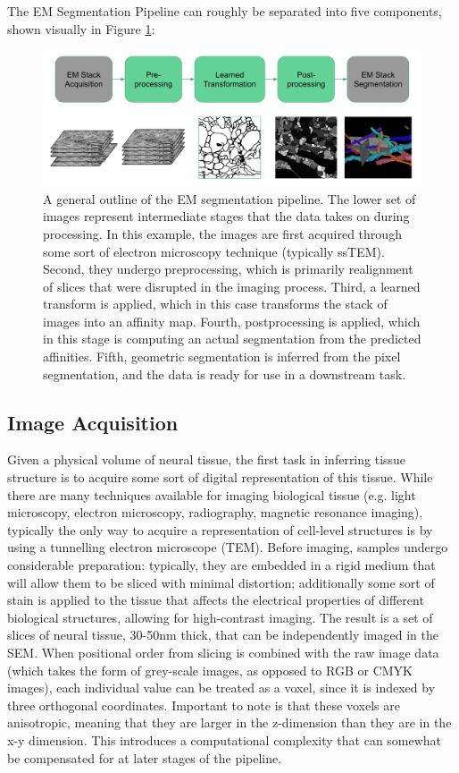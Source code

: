 The EM Segmentation Pipeline can roughly be separated into five components, shown visually in Figure \ref{fig:segmentation_pipeline}:

\begin{figure}
\centering
\includegraphics[width=\textwidth]{img/seg_pipeline.png}
\caption[A general outline of the EM segmentation pipeline]{A general outline of the EM segmentation pipeline. The lower set of images represent intermediate stages that the data takes on during processing. In this example, the images are first acquired through some sort of electron microscopy technique (typically ssTEM). Second, they undergo preprocessing, which is primarily realignment of slices that were disrupted in the imaging process. Third, a learned transform is applied, which in this case transforms the stack of images into an affinity map. Fourth, postprocessing is applied, which in this stage is computing an actual segmentation from the predicted affinities. Fifth, geometric segmentation is inferred from the pixel segmentation, and the data is ready for use in a downstream task. }
\label{fig:segmentation_pipeline}
\end{figure}

\subsection{Image Acquisition}
Given a physical volume of neural tissue, the first task in inferring tissue structure is to acquire some sort of digital representation of this tissue. While there are many techniques available for imaging biological tissue (e.g. light microscopy, electron microscopy, radiography, magnetic resonance imaging), typically the only way to acquire a representation of cell-level structures is by using a tunnelling electron microscope (TEM)\cite{Mielanczyk2015}. Before imaging, samples undergo considerable preparation: typically, they are embedded in a rigid medium that will allow them to be sliced with minimal distortion; additionally some sort of stain is applied to the tissue that affects the electrical properties of different biological structures, allowing for high-contrast imaging. The result is a set of slices of neural tissue, 30-50nm thick, that can be independently imaged in the SEM. When positional order from slicing is combined with the raw image data (which takes the form of grey-scale images, as opposed to RGB or CMYK images), each individual value can be treated as a voxel, since it is indexed by three orthogonal coordinates. Important to note is that these voxels are anisotropic, meaning that they are larger in the z-dimension than they are in the x-y dimension. This introduces a computational complexity that can somewhat be compensated for at later stages of the pipeline.

